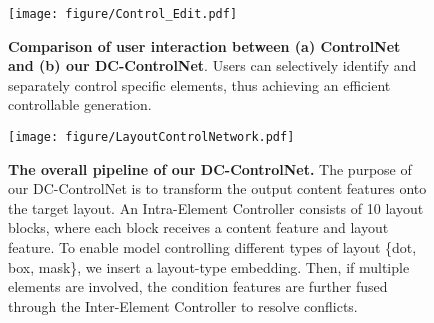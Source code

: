 \begin{figure}
    \centering
    \texttt{[image: figure/Control\_Edit.pdf]}
    \vspace{-1mm}
    \caption{\textbf{Comparison of user interaction between (a) ControlNet~\cite{zhang2023adding} and (b) our {DC-ControlNet}}. Users can selectively identify and separately control specific elements, thus achieving an efficient controllable generation.}
    \label{fig:edit}
    \vspace{-6mm}
\end{figure}

\begin{figure*}
    \centering
    \texttt{[image: figure/LayoutControlNetwork.pdf]}
    \caption{\textbf{The overall pipeline of our DC-ControlNet.} The purpose of our DC-ControlNet is to transform the output content features onto the target layout. An Intra-Element Controller consists of 10 layout blocks, where each block receives a content feature and layout feature. To enable model controlling different types of layout \{dot, box, mask\}, we insert a layout-type embedding. Then, if multiple elements are involved, the condition features are further fused through the Inter-Element Controller to resolve conflicts.}
    \label{fig:over-pipeline}
    \vspace{-3mm}
\end{figure*}